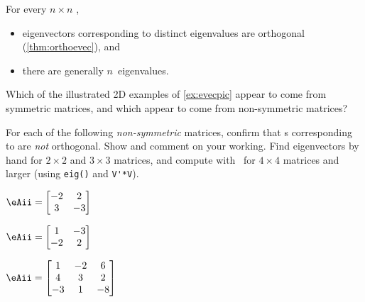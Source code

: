 \begin{exercise}  
For every \(n\times n\) ,
\begin{itemize}
\item  eigenvectors corresponding to distinct eigenvalues are orthogonal (\cref{thm:orthoevec}), and
\item  there are generally \(n\)~eigenvalues.
\end{itemize}
Which of the illustrated 2D examples of \cref{ex:evecpic} appear to come from symmetric matrices, and which appear to come from non-symmetric matrices?
\end{exercise}





\begin{exercise} \label{ex:smnoevs} 
For each of the following \emph{non-symmetric} matrices, confirm that s corresponding to  are \emph{not} orthogonal.  Show and comment on your working.
Find eigenvectors by hand for \(2\times 2\) and \(3\times 3\) matrices, and compute with \script\ for \(4\times 4\) matrices and larger (using \verb|eig()| and \verb|V'*V|).
\begin{Parts}
\item \(\eAii=\begin{bmatrix} -2&2
\\3&-3 \end{bmatrix}\)

\begin{OmitV1}
\item \(\eAii=\begin{bmatrix}1&-3
\\-2&2 \end{bmatrix}\)

\item \(\eAii=\begin{bmatrix} 1&-2&6
\\4&3&2
\\-3&1&-8 \end{bmatrix}\)
\end{OmitV1}


\end{Parts}
\end{exercise}
